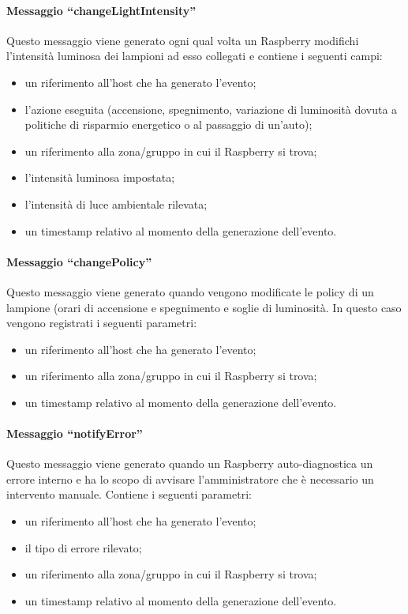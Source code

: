 \paragraph{Messaggio ``changeLightIntensity''}
Questo messaggio viene generato ogni qual volta un Raspberry modifichi l'intensità luminosa dei lampioni ad esso collegati e contiene i seguenti campi:
\begin{itemize}
 \item un riferimento all'host che ha generato l'evento;
 \item l'azione eseguita (accensione, spegnimento, variazione di luminosità dovuta a politiche di risparmio energetico o al passaggio di un'auto);
 \item un riferimento alla zona/gruppo in cui il Raspberry si trova;
 \item l'intensità luminosa impostata;
 \item l'intensità di luce ambientale rilevata;
 \item un timestamp relativo al momento della generazione dell'evento.
\end{itemize}
\paragraph{Messaggio ``changePolicy''}
Questo messaggio viene generato quando vengono modificate le policy di un lampione (orari di accensione e spegnimento e soglie di luminosità.
In questo caso vengono registrati i seguenti parametri:
\begin{itemize}
 \item un riferimento all'host che ha generato l'evento;
 \item un riferimento alla zona/gruppo in cui il Raspberry si trova;
 \item un timestamp relativo al momento della generazione dell'evento.
\end{itemize}
\paragraph{Messaggio ``notifyError''}
Questo messaggio viene generato quando un Raspberry auto-diagnostica un errore interno e ha lo scopo di avvisare l'amministratore che è necessario un intervento manuale.
Contiene i seguenti parametri:
\begin{itemize}
 \item un riferimento all'host che ha generato l'evento;
 \item il tipo di errore rilevato;
 \item un riferimento alla zona/gruppo in cui il Raspberry si trova;
 \item un timestamp relativo al momento della generazione dell'evento.
\end{itemize}


